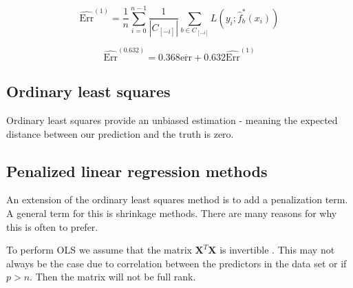 \begin{equation}
    \widehat{\text{Err}}^{(1)} = \frac{1}{n} \sum_{i=0}^{n-1} \frac{1}{|C_{[-i]}|} \sum_{b \in C_{[-i]}} L\left(y_i; \widehat{f}_b^*(x_i)\right)
\end{equation}

\begin{equation}
    \widehat{\text{Err}}^{(0.632)} = 0.368 \overline{\text{err}} + 0.632 \widehat{\text{Err}}^{(1)}
\end{equation}


\subsection{Ordinary least squares}
Ordinary least squares provide an unbiased estimation - meaning the expected distance between our prediction and the truth is zero. 



\subsection{Penalized linear regression methods}

An extension of the ordinary least squares method is to add a penalization term. A general term for this is shrinkage methods. There are many reasons for why this is often to prefer. 

To perform OLS we assume that the matrix $\boldsymbol{X}^T\boldsymbol{X}$ is invertible . This may not always be the case due to correlation between the predictors in the data set or if $p > n$. Then the matrix will not be full rank. 

